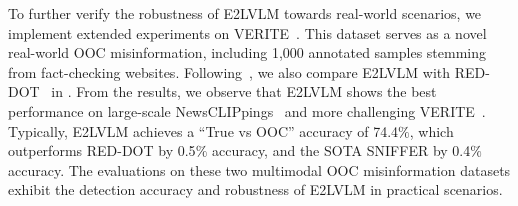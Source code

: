 To further verify the robustness of E2LVLM towards real-world scenarios, we implement extended experiments on VERITE~\cite{papadopoulos2024verite}. This dataset serves as a novel real-world OOC misinformation, including 1,000 annotated samples stemming from fact-checking websites. Following~\cite{qi2024sniffer}, we also compare E2LVLM with RED-DOT~\cite{papadopoulos2023red} in . From the results, we observe that E2LVLM shows the best performance on large-scale NewsCLIPpings~\cite{luo2021newsclippings} and more challenging VERITE~\cite{papadopoulos2024verite}. Typically, E2LVLM achieves a ``True vs OOC'' accuracy of 74.4$\%$, which outperforms RED-DOT by 0.5$\%$ accuracy, and the SOTA SNIFFER by 0.4$\%$ accuracy. The evaluations on these two multimodal OOC misinformation datasets exhibit the detection accuracy and robustness of E2LVLM in practical scenarios.